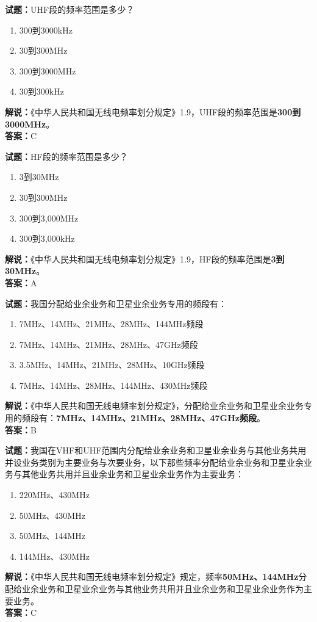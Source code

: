 \documentclass{ctexbook}
\begin{document}
\bigskip


\noindent\textbf{试题：}UHF段的频率范围是多少？
\begin{enumerate}[leftmargin=3em]
	\item 300到3000kHz
	\item 30到300MHz
	\item 300到3000MHz
	\item 30到300kHz
\end{enumerate}
\noindent\textbf{解说：}《中华人民共和国无线电频率划分规定》1.9，UHF段的频率范围是\textbf{300到3000MHz}。\\\noindent\textbf{答案：}C


\bigskip


\noindent\textbf{试题：}HF段的频率范围是多少？
\begin{enumerate}[leftmargin=3em]
	\item 3到30MHz
	\item 30到300MHz
	\item 300到3,000MHz
	\item 300到3,000kHz
\end{enumerate}
\noindent\textbf{解说：}《中华人民共和国无线电频率划分规定》1.9，HF段的频率范围是\textbf{3到30MHz}。\\\noindent\textbf{答案：}A


\bigskip


\noindent\textbf{试题：}我国分配给业余业务和卫星业余业务专用的频段有：
\begin{enumerate}[leftmargin=3em]
	\item 7MHz、14MHz、21MHz、28MHz、144MHz频段
	\item 7MHz、14MHz、21MHz、28MHz、47GHz频段
	\item 3.5MHz、14MHz、21MHz、28MHz、10GHz频段
	\item 7MHz、14MHz、28MHz、144MHz、430MHz频段
\end{enumerate}
\noindent\textbf{解说：}《中华人民共和国无线电频率划分规定》，分配给业余业务和卫星业余业务专用的频段有：\textbf{7MHz、14MHz、21MHz、28MHz、47GHz频段}。\\\noindent\textbf{答案：}B


\bigskip


\noindent\textbf{试题：}我国在VHF和UHF范围内分配给业余业务和卫星业余业务与其他业务共用并设业务类别为主要业务与次要业务，以下那些频率分配给业余业务和卫星业余业务与其他业务共用并且业余业务和卫星业余业务作为主要业务： 
\begin{enumerate}[leftmargin=3em]
	\item 220MHz、430MHz
	\item 50MHz、430MHz
	\item 50MHz、144MHz
	\item 144MHz、430MHz
\end{enumerate}
\noindent\textbf{解说：}《中华人民共和国无线电频率划分规定》规定，频率\textbf{50MHz、144MHz}分配给业余业务和卫星业余业务与其他业务共用并且业余业务和卫星业余业务作为主要业务。\\\noindent\textbf{答案：}C
\end{document}
